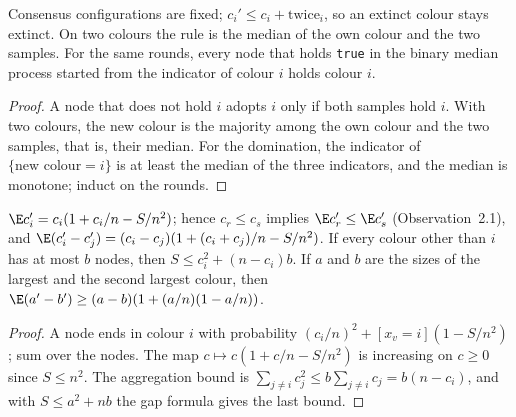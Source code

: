 \begin{lemma}\label{lem:tc-basic}
\leanok{}
Consensus configurations are fixed; $c_i'\le c_i+\mathrm{twice}_i$, so an extinct colour stays
extinct. On two colours the rule is the median of the own colour and the two samples. For the
same rounds, every node that holds \texttt{true} in the binary median process started from the
indicator of colour $i$ holds colour $i$.
\end{lemma}
\begin{proof}\leanok
A node that does not hold $i$ adopts $i$ only if both samples hold $i$. With two colours, the new
colour is the majority among the own colour and the two samples, that is, their median. For the
domination, the indicator of $\{\text{new colour}=i\}$ is at least the median of the three
indicators, and the median is monotone; induct on the rounds.
\end{proof}

\begin{lemma}\label{lem:tc-expect}
\leanok{}
$\E c_i'=c_i(1+c_i/n-S/n^2)$; hence $c_r\le c_s$ implies $\E c_r'\le\E c_s'$
(Observation~2.1), and $\E(c_i'-c_j')=(c_i-c_j)(1+(c_i+c_j)/n-S/n^2)$. If every colour other
than $i$ has at most $b$ nodes, then $S\le c_i^2+(n-c_i)b$. If $a$ and $b$ are the sizes of the
largest and the second largest colour, then $\E(a'-b')\ge(a-b)(1+(a/n)(1-a/n))$.
\end{lemma}
\begin{proof}\leanok
A node ends in colour $i$ with probability $(c_i/n)^2+[x_v=i](1-S/n^2)$; sum over the nodes. The
map $c\mapsto c(1+c/n-S/n^2)$ is increasing on $c\ge0$ since $S\le n^2$. The aggregation bound is
$\sum_{j\ne i}c_j^2\le b\sum_{j\ne i}c_j=b(n-c_i)$, and with $S\le a^2+nb$ the gap formula gives
the last bound.
\end{proof}

